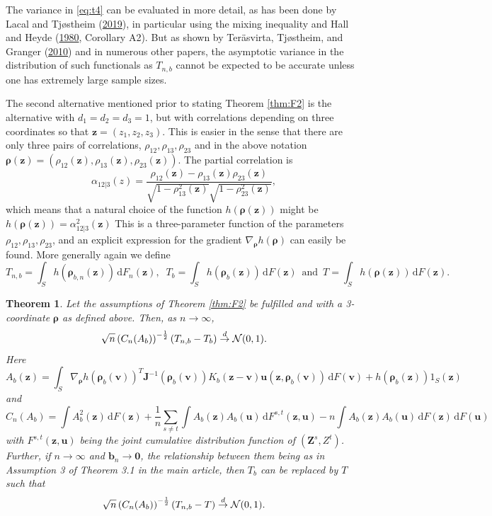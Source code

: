 \documentclass[
  12pt,
  letterpaper]{article}
\newtheorem{thm}{Theorem}[section]
\numberwithin{equation}{section}
\newcommand{\Z}{\bm{Z}}
\newcommand{\z}{\bm{z}}
\newcommand{\fv}{\bm{v}}
\newcommand{\fu}{\bm{u}}
\newcommand{\J}{\bm{J}}
\newcommand{\frho}{\bm{\rho}}
\newcommand{\bb}{\bm{b}}
\newcommand{\di}{\,\textrm{d}}
\begin{document}
The variance in \eqref{eq:t4} can be evaluated in more detail, as has been done by Lacal and Tjøstheim (\protect\hyperlink{ref-lacal2018estimating}{2019}), in particular using the mixing inequality and Hall and Heyde (\protect\hyperlink{ref-hall1980martingale}{1980}, Corollary A2). But as shown by Teräsvirta, Tjøstheim, and Granger (\protect\hyperlink{ref-terasvirta2010modelling}{2010}) and in numerous other papers, the asymptotic variance in the distribution of such functionals as \(T_{n,b}\) cannot be expected to be accurate unless one has extremely large sample sizes.

The second alternative mentioned prior to stating Theorem \ref{thm:F2} is the alternative with \(d_1=d_2=d_3=1\), but with correlations depending on three coordinates so that \(\z=(z_1,z_2,z_3)\). This is easier in the sense that there are only three pairs of correlations, \(\rho_{12}, \rho_{13}, \rho_{23}\) and in the above notation \(\frho(\z) = (\rho_{12}(\z), \rho_{13}(\z), \rho_{23}(\z))\). The partial correlation is
\[
\alpha_{12|3}(z) = \frac{\rho_{12}(\z)-\rho_{13}(\z)\rho_{23}(\z)}{\sqrt{1-\rho_{13}^2(\z)}\sqrt{1-\rho_{23}^2(\z)}},
\]
which means that a natural choice of the function \(h(\frho(\z))\) might be \(h(\frho(\z)) = \alpha_{12|3}^2(\z)\) This is a three-parameter function of the parameters \(\rho_{12}, \rho_{13},\rho_{23}\), and an explicit expression for the gradient \(\nabla_{\frho}h(\frho)\) can easily be found. More generally again we define
\[
T_{n,b} = \int_S h(\frho_{b,n}(\z)) \di F_n(\z),\;\; T_b= \int_S h(\frho_b(\z)) \di F(\z) \, \textrm{ and } \, T = \int_S h(\frho(\z)) \di F(\z).
\]

\begin{thm}
Let the assumptions of Theorem \ref{thm:F2} be fulfilled and with a 3-coordinate $\frho$ as defined above. Then,
as $n \to \infty$,
$$
\sqrt{n}\left(C_{n}(A_b)\right)^{-\frac{1}{2}}(T_{n,b} - T_b) \buildrel {d} \over {\to} {\cal N}(0,1).
$$
Here 
$$
A_b(\z) = \int_S \nabla_{\frho}h(\frho_b(\fv))^{T}{\J}^{-1}(\frho_b(\fv))K_b(\z-\fv)\fu(\z,\frho_b(\fv)) \di F(\fv) + h(\frho_b(\z))1_S(\z)
$$
and 
$$
C_n(A_b) = \int A_b^2(\z) \di F(\z) + \frac{1}{n}\sum_{s \neq t}\int A_b(\z)A_b(\fu) \di F^{s,t}(\z,\fu) - n\int A_b(\z)A_b(\fu) \di F(\z) \di F(\fu)
$$
with $F^{s,t}(\z,\fu)$ being the joint cumulative distribution function of $(\Z^s,Z^t)$. Further, if $n \to \infty$ and $\bb_n \to \bm{0}$, the relationship between them being as in Assumption 3 of Theorem 3.1 in the main article, then $T_b$ can be replaced by $T$ such that
$$
\sqrt{n}\left(C_n(A_b)\right)^{-\frac{1}{2}}(T_{n,b} - T) \buildrel {d} \over {\to} {\cal N}(0,1).
$$
\label{thm:F3}
\end{thm}
\end{document}
